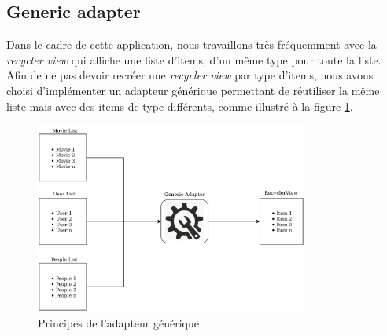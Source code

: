 \subsection{Generic adapter}\label{generic-adapter}
Dans le cadre de cette application, nous travaillons très fréquemment avec la \textit{recycler view} qui affiche une liste d'items, d'un même type pour toute la liste. Afin de ne pas devoir recréer une \textit{recycler view} par type d'items, nous avons choisi d'implémenter un adapteur générique permettant de réutiliser la même liste mais avec des items de type différents, comme illustré à la figure \ref{generic_adapter_img}.
\begin{figure}
    \begin{center}
        \includegraphics[width=0.8\textwidth]{img/schemas/Generic_Adapter.png}
    \end{center}
    \caption{Principes de l'adapteur générique}
    \label{generic_adapter_img}
\end{figure}